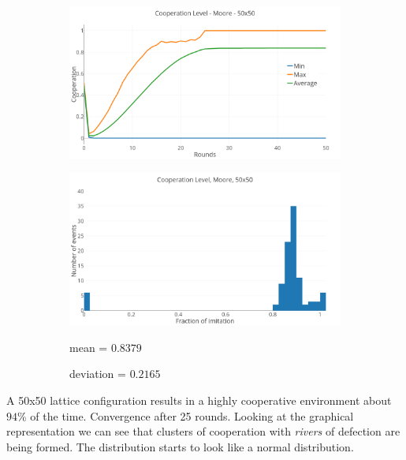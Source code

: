 \documentclass[a4paper, 11pt]{article}
\begin{document}
\begin{figure}[H]
\begin{subfigure}{.75\textwidth}
	\includegraphics[width=1\linewidth]{PDMoore50x50}
\end{subfigure}

\begin{subfigure}{.75\textwidth}
	\includegraphics[width=1\linewidth]{PDMoore50x50HG}
\end{subfigure}%
\begin{subfigure}{.25\textwidth}
	mean = $0.8379$
	
	deviation = $0.2165$
\end{subfigure}

\end{figure}

A 50x50 lattice configuration results in a highly cooperative environment about $94\%$ of the time. Convergence after 25 rounds. Looking at the graphical representation we can see that clusters of cooperation with \textit{rivers} of defection are being formed. The distribution starts to look like a normal distribution.
\end{document}
